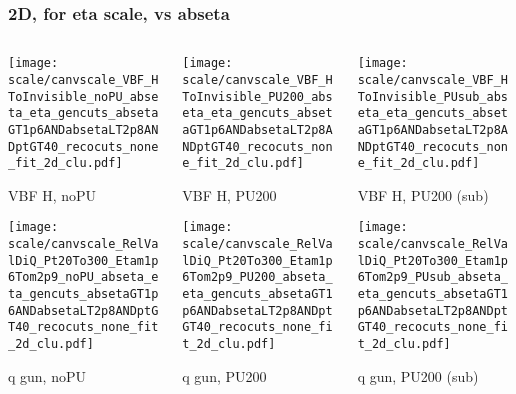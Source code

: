 \documentclass[8pt]{beamer}
\begin{document}
   \begin{frame}
  \frametitle{2D, for eta scale, vs abseta}
  
  \begin{columns}
   \begin{column}{0.35\textwidth}
     \texttt{[image: scale/canvscale\_VBF\_HToInvisible\_noPU\_abseta\_eta\_gencuts\_absetaGT1p6ANDabsetaLT2p8ANDptGT40\_recocuts\_none\_fit\_2d\_clu.pdf]}
     
     VBF H, noPU
    
     \texttt{[image: scale/canvscale\_RelValDiQ\_Pt20To300\_Etam1p6Tom2p9\_noPU\_abseta\_eta\_gencuts\_absetaGT1p6ANDabsetaLT2p8ANDptGT40\_recocuts\_none\_fit\_2d\_clu.pdf]}
     
     q gun, noPU
   \end{column}
   \begin{column}{0.35\textwidth}
     \texttt{[image: scale/canvscale\_VBF\_HToInvisible\_PU200\_abseta\_eta\_gencuts\_absetaGT1p6ANDabsetaLT2p8ANDptGT40\_recocuts\_none\_fit\_2d\_clu.pdf]}
     
     VBF H, PU200
    
     \texttt{[image: scale/canvscale\_RelValDiQ\_Pt20To300\_Etam1p6Tom2p9\_PU200\_abseta\_eta\_gencuts\_absetaGT1p6ANDabsetaLT2p8ANDptGT40\_recocuts\_none\_fit\_2d\_clu.pdf]}
     
     q gun, PU200
   \end{column}
   \begin{column}{0.35\textwidth}
     \texttt{[image: scale/canvscale\_VBF\_HToInvisible\_PUsub\_abseta\_eta\_gencuts\_absetaGT1p6ANDabsetaLT2p8ANDptGT40\_recocuts\_none\_fit\_2d\_clu.pdf]}
     
     VBF H, PU200 (sub)
    
     \texttt{[image: scale/canvscale\_RelValDiQ\_Pt20To300\_Etam1p6Tom2p9\_PUsub\_abseta\_eta\_gencuts\_absetaGT1p6ANDabsetaLT2p8ANDptGT40\_recocuts\_none\_fit\_2d\_clu.pdf]}
     
     q gun, PU200 (sub)
   \end{column}
  \end{columns}
 \end{frame}
 
\end{document}
